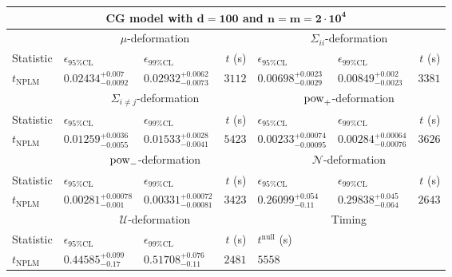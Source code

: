 \begin{tabular}{l|llr|llr}
	\toprule
	\multicolumn{7}{c}{{\bf CG model with $\mathbf{d=100}$ and $\mathbf{n=m=2\cdot 10^{4}}$}} \\
	\toprule
	\multicolumn{1}{c}{} & \multicolumn{3}{c}{$\mu$-deformation} & \multicolumn{3}{c}{$\Sigma_{ii}$-deformation} \\
	Statistic & $\epsilon_{95\%\mathrm{CL}}$ & $\epsilon_{99\%\mathrm{CL}}$ & $t$ (s) & $\epsilon_{95\%\mathrm{CL}}$ & $\epsilon_{99\%\mathrm{CL}}$ & $t$ (s) \\
	\midrule
	$t_{\mathrm{NPLM}}$ & $0.02434_{-0.0092}^{+0.007}$ & $0.02932_{-0.0073}^{+0.0062}$ & $3112$ & $0.00698_{-0.0029}^{+0.0023}$ & $0.00849_{-0.0023}^{+0.002}$ & $3381$ \\
	\toprule
	\multicolumn{1}{c}{} & \multicolumn{3}{c}{$\Sigma_{i\neq j}$-deformation} & \multicolumn{3}{c}{$\rm{pow}_{+}$-deformation} \\
	Statistic & $\epsilon_{95\%\mathrm{CL}}$ & $\epsilon_{99\%\mathrm{CL}}$ & $t$ (s) & $\epsilon_{95\%\mathrm{CL}}$ & $\epsilon_{99\%\mathrm{CL}}$ & $t$ (s) \\
	\midrule
	$t_{\mathrm{NPLM}}$ & $0.01259_{-0.0055}^{+0.0036}$ & $0.01533_{-0.0041}^{+0.0028}$ & $5423$ & $0.00233_{-0.00095}^{+0.00074}$ & $0.00284_{-0.00076}^{+0.00064}$ & $3626$ \\
	\toprule
	\multicolumn{1}{c}{} & \multicolumn{3}{c}{$\rm{pow}_{-}$-deformation} & \multicolumn{3}{c}{$\mathcal{N}$-deformation} \\
	Statistic & $\epsilon_{95\%\mathrm{CL}}$ & $\epsilon_{99\%\mathrm{CL}}$ & $t$ (s) & $\epsilon_{95\%\mathrm{CL}}$ & $\epsilon_{99\%\mathrm{CL}}$ & $t$ (s) \\
	\midrule
	$t_{\mathrm{NPLM}}$ & $0.00281_{-0.001}^{+0.00078}$ & $0.00331_{-0.00081}^{+0.00072}$ & $3423$ & $0.26099_{-0.11}^{+0.054}$ & $0.29838_{-0.064}^{+0.045}$ & $2643$ \\
	\toprule
	\multicolumn{1}{c}{} & \multicolumn{3}{c}{$\mathcal{U}$-deformation} & \multicolumn{3}{c}{Timing} \\
	Statistic & $\epsilon_{95\%\mathrm{CL}}$ & $\epsilon_{99\%\mathrm{CL}}$ & $t$ (s) & $t^{\mathrm{null}}$ (s) \\
	\midrule
	$t_{\mathrm{NPLM}}$ & $0.44585_{-0.17}^{+0.099}$ & $0.51708_{-0.11}^{+0.076}$ & $2481$ & $5558$ \\
	\bottomrule
\end{tabular}